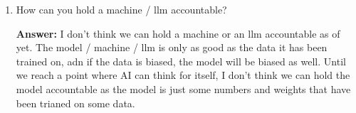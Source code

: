 \documentclass{article}
\theoremstyle{mytheoremstyle}
\theoremstyle{mytheoremstyle}
\theoremstyle{myproblemstyle}
\begin{document}
\begin{enumerate}
    \item How can you hold a machine / llm accountable?
    
    \textbf{Answer:} I don't think we can hold a machine or an llm accountable as of yet. The model / machine / llm is only as good as the data it has been trained on, adn if the data is biased, the model will be biased as well. Until we reach a point where AI can think for itself, I don't think we can hold the model accountable as the model is just some numbers and weights that have been trianed on some data.
\end{enumerate}
\end{document}
